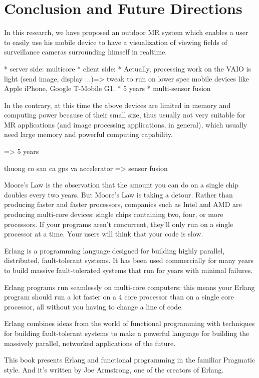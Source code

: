 \chapter{Conclusion and Future Directions}
\label{Chapter5}

In this research, we have proposed an outdoor MR system which enables a user to easily use his mobile device to have a visualization of viewing fields of surveillance cameras surrounding himself in realtime.

* server side: multicore
* client side:
	* Actually, processing work on the VAIO is light (send image, display ...)=> tweak to run on lower spec mobile devices like Apple iPhone, Google T-Mobile G1.
	* 5 years
* multi-sensor fusion


In the contrary, at this time the above devices are limited in memory and computing power because of their small size, thus usually not very suitable for MR applications (and image processing applications, in general), which usually need large memory and powerful computing capability.

=> 5 years

thuong co san ca gps va accelerator => sensor fusion

Moore's Law is the observation that the amount you can do on a single chip doubles every two years. But Moore's Law is taking a detour. Rather than producing faster and faster processors, companies such as Intel and AMD are producing multi-core devices: single chips containing two, four, or more processors. If your programs aren't concurrent, they'll only run on a single processor at a time. Your users will think that your code is slow.

Erlang is a programming language designed for building highly parallel, distributed, fault-tolerant systems. It has been used commercially for many years to build massive fault-tolerated systems that run for years with minimal failures.

Erlang programs run seamlessly on multi-core computers: this means your Erlang program should run a lot faster on a 4 core processor than on a single core processor, all without you having to change a line of code.

Erlang combines ideas from the world of functional programming with techniques for building fault-tolerant systems to make a powerful language for building the massively parallel, networked applications of the future.

This book presents Erlang and functional programming in the familiar Pragmatic style. And it's written by Joe Armstrong, one of the creators of Erlang.



